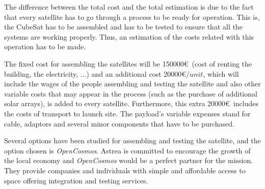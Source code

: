 The difference between the total cost and the total estimation is due to the fact that every satellite has to go through a process to be ready for operation. This is, the CubeSat has to be assembled and has to be tested to ensure that all the systems are working properly. Thus, an estimation of the costs related with this operation has to be made.

The fixed cost for assembling the satellites will be 150000\euro~(cost of renting the building, the electricity, ...) and an additional cost 20000\euro $ / unit$, which will include the wages of the people assembling and testing the satellite and also other variable costs that may appear in the process (such as the purchase of additional solar arrays), is added to every satellite. Furthermore, this extra 20000\euro~includes the costs of transport to launch site. The payload's variable expenses stand for cable, adaptors and several minor components that have to be purchased.

Several options have been studied for assembling and testing the satellite, and the option chosen is \textit{OpenCosmos}. Astrea is committed to encourage the growth of the local economy and \textit{OpenCosmos} would be a perfect partner for the mission. They provide companies and individuals with simple and affordable access to space offering integration and testing services.